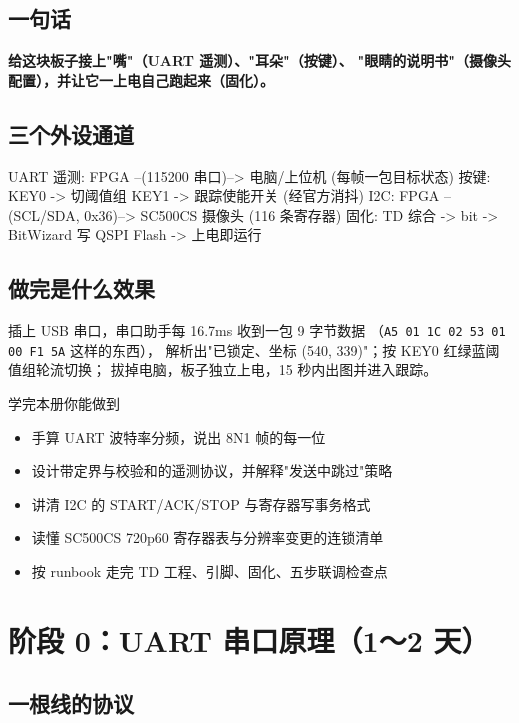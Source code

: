\documentclass[11pt]{ctexart}
\newcommand{\code}[1]{\texttt{#1}}
\begin{document}
\subsection{一句话}

\textbf{给这块板子接上"嘴"（UART 遥测）、"耳朵"（按键）、}
\textbf{"眼睛的说明书"（摄像头配置），并让它一上电自己跑起来（固化）。}

\subsection{三个外设通道}

\begin{Verilog}
UART 遥测:  FPGA --(115200 串口)--> 电脑/上位机 (每帧一包目标状态)
按键:       KEY0 -> 切阈值组   KEY1 -> 跟踪使能开关 (经官方消抖)
I2C:        FPGA --(SCL/SDA, 0x36)--> SC500CS 摄像头 (116 条寄存器)
固化:       TD 综合 -> bit -> BitWizard 写 QSPI Flash -> 上电即运行
\end{Verilog}

\subsection{做完是什么效果}

插上 USB 串口，串口助手每 16.7ms 收到一包 9 字节数据
（\code{A5 01 1C 02 53 01 00 F1 5A} 这样的东西），
解析出"已锁定、坐标 (540, 339)"；按 KEY0 红绿蓝阈值组轮流切换；
拔掉电脑，板子独立上电，15 秒内出图并进入跟踪。

\begin{okbox}{学完本册你能做到}
\begin{itemize}
  \item 手算 UART 波特率分频，说出 8N1 帧的每一位
  \item 设计带定界与校验和的遥测协议，并解释"发送中跳过"策略
  \item 讲清 I2C 的 START/ACK/STOP 与寄存器写事务格式
  \item 读懂 SC500CS 720p60 寄存器表与分辨率变更的连锁清单
  \item 按 runbook 走完 TD 工程、引脚、固化、五步联调检查点
\end{itemize}
\end{okbox}

\section{阶段 0：UART 串口原理（1～2 天）}

\subsection{一根线的协议}
\end{document}
